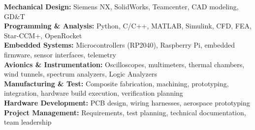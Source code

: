 \documentclass[10pt]{article}
\begin{document}
\textbf{Mechanical Design:} Siemens NX, SolidWorks, Teamcenter, CAD modeling, GD\&T \\
\textbf{Programming \& Analysis:} Python, C/C++, MATLAB, Simulink, CFD, FEA, Star-CCM+, OpenRocket \\
\textbf{Embedded Systems:} Microcontrollers (RP2040), Raspberry Pi, embedded firmware, sensor interfaces, telemetry \\
\textbf{Avionics \& Instrumentation:} Oscilloscopes, multimeters, thermal chambers, wind tunnels, spectrum analyzers, Logic Analyzers \\
\textbf{Manufacturing \& Test:} Composite fabrication, machining, prototyping, integration, hardware build execution, verification planning \\
\textbf{Hardware Development:} PCB design, wiring harnesses, aerospace prototyping \\
\textbf{Project Management:} Requirements, test planning, technical documentation, team leadership
\end{document}
